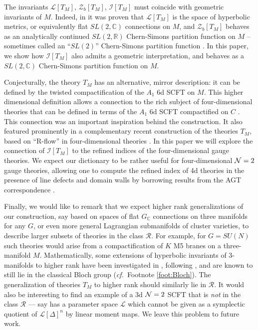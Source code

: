 \documentclass[11pt,letterpaper]{article}
\numberwithin{equation}{section}
\newcommand{\cf}{\emph{cf.}}
\newcommand{\R}{{\mathbb R}}
\newcommand{\C}{{\mathbb C}}
\newcommand{\CI}{\mathcal{I}}
\newcommand{\CL}{\mathcal{L}}
\newcommand{\CR}{\mathcal{R}}
\newcommand{\CZ}{\mathcal{Z}}
\begin{document}
The invariants  $\CL[T_M]$, $\CZ_b[T_M]$, $\CI[T_M]$ must coincide with geometric  invariants of $M$.
Indeed, in \cite{DGH,DGG} it was proven that $\CL[T_M]$ is the space of hyperbolic metrics, or equivalently flat
$SL(2,\C)$ connections on $M$, and $\CZ_b[T_M]$ behaves as an analytically continued $SL(2,\R)$ Chern-Simons partition function on $M$ \cite{Yamazaki-3d, DG-Sdual} -- sometimes called an ``$SL(2)$'' Chern-Simons partition function \cite{gukov-2003, DGLZ, Wit-anal, Dimofte-QRS}.
In this paper, we show how $\CI[T_M]$ also admits a geometric interpretation, and behaves as a $SL(2,\C)$ Chern-Simons partition function on $M$.

Conjecturally, the theory $T_M$ has an alternative, mirror description: it can be defined by the twisted compactification of the $A_1$ 6d SCFT on $M$. This higher dimensional definition
allows a connection to the rich subject of four-dimensional theories that can be defined in terms of the $A_1$ 6d SCFT compactified on $C$ \cite{GMN, Gaiotto-dualities}.
This connection was an important inspiration behind the construction. It also featured prominently in a complementary recent construction of the theories $T_M$, based on ``R-flow'' in four-dimensional theories \cite{CCV}.
In this paper we will explore the connection of $\CI[T_M]$ to the refined indices of the four-dimensional gauge theories. We expect our dictionary to be rather useful
for four-dimensional ${\cal N}=2$ gauge theories, allowing one to compute the refined index of 4d theories in the presence of line defects and domain walls by borrowing results from the AGT correspondence \cite{AGT, AGGTV, DGOT, DGG-defects}.

Finally, we would like to remark that we expect higher rank generalizations of our construction, say based on spaces of flat $G_\C$ connections on three manifolds for any $G$,
or even more general Lagrangian submanifolds of cluster varieties, to describe larger subsets of theories in the class $\CR$. For example, for $G=SU(N)$ such theories would arise from a compactification of $K$ M5 branes on a three-manifold $M$. Mathematically, some extensions of hyperbolic invariants of 3-manifolds to higher rank have been investigated in \cite{Zickert-sl3, GTZ-slN}, following \cite{FG-Teich}, and are known to still lie in the classical Bloch group (\cf\ Footnote \ref{foot:Bloch}). The generalization of theories $T_M$ to higher rank should similarly lie in $\CR$. It would also be interesting to find an example of a 3d ${\cal N}=2$ SCFT that is
{\it not} in the class $\CR$ --- say has a parameter space $\CL$ which cannot be given as a symplectic quotient of $\CL[\Delta]^n$ by linear moment maps. We leave this problem to future work. \\
\end{document}
